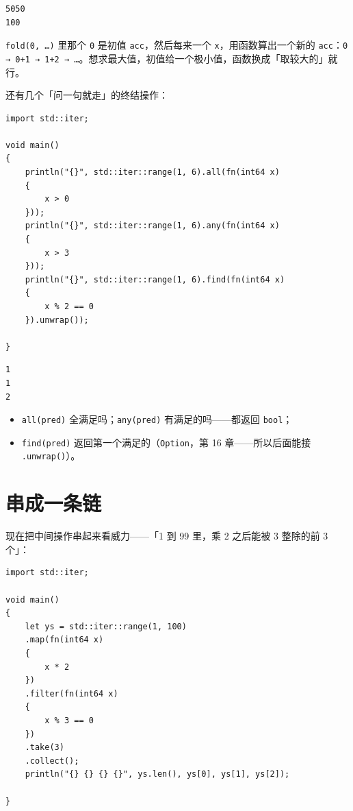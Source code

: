 \par
\medskip
\begin{lstlisting}[style=out]
5050
100
\end{lstlisting}
\par
\medskip

\texttt{fold(\allowbreak{}0,\allowbreak{} …)\allowbreak{}} 里那个 \texttt{0} 是初值 \texttt{acc}，然后每来一个 \texttt{x}，用函数算出一个新的 \texttt{acc}：\texttt{0 → 0+1 → 1+2 → …}。想求最大值，初值给一个极小值，函数换成「取较大的」就行。

还有几个「问一句就走」的终结操作：

\par
\medskip
\begin{lstlisting}[style=chali]
import std::iter;

void main()
{
    println("{}", std::iter::range(1, 6).all(fn(int64 x)
    {
        x > 0
    }));
    println("{}", std::iter::range(1, 6).any(fn(int64 x)
    {
        x > 3
    }));
    println("{}", std::iter::range(1, 6).find(fn(int64 x)
    {
        x % 2 == 0
    }).unwrap());

}
\end{lstlisting}
\par
\medskip

\par
\medskip
\begin{lstlisting}[style=out]
1
1
2
\end{lstlisting}
\par
\medskip

\begin{itemize}

\item \texttt{all(\allowbreak{}pred)\allowbreak{}} 全满足吗；\texttt{any(\allowbreak{}pred)\allowbreak{}} 有满足的吗——都返回 \texttt{bool}；

\item \texttt{find(\allowbreak{}pred)\allowbreak{}} 返回第一个满足的（\texttt{Option}，第 16 章——所以后面能接 \texttt{.\allowbreak{}unwrap(\allowbreak{})\allowbreak{}}）。

\end{itemize}

\section{串成一条链}

现在把中间操作串起来看威力——「1 到 99 里，乘 2 之后能被 3 整除的前 3 个」：

\par
\medskip
\begin{lstlisting}[style=chali]
import std::iter;

void main()
{
    let ys = std::iter::range(1, 100)
    .map(fn(int64 x)
    {
        x * 2
    })
    .filter(fn(int64 x)
    {
        x % 3 == 0
    })
    .take(3)
    .collect();
    println("{} {} {} {}", ys.len(), ys[0], ys[1], ys[2]);

}
\end{lstlisting}
\par
\medskip

